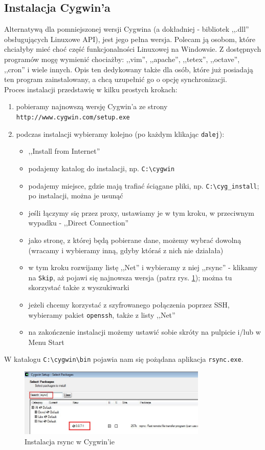 \subsection{Instalacja Cygwin'a}
\label{full}
Alternatywą dla pomniejszonej wersji Cygwina (a dokładniej - bibliotek ,,.dll'' obsługujących Linuxowe API), jest jego pełna wersja. Polecam ją osobom, które chciałyby mieć choć część funkcjonalności Linuxowej na Windowsie. Z dostępnych programów mogę wymienić chociażby: ,,vim'', ,,apache'', ,,tetex'', ,,octave'', ,,cron'' i wiele innych.  Opis ten dedykowany także dla osób, które już posiadają ten program zainstalowany, a chcą uzupełnić go o opcję synchronizacji. \\
Proces instalacji przedstawię w kilku prostych krokach:
\begin{enumerate}
\item pobieramy najnowszą wersję Cygwin'a ze strony \verb|http://www.cygwin.com/setup.exe|
\item podczas instalacji wybieramy kolejno (po każdym klikając \verb|dalej|):
  \begin{itemize}
  \item ,,Install from Internet''
  \item podajemy katalog do instalacji, np. \verb|C:\cygwin|
  \item podajemy miejsce, gdzie mają trafiać ściągane pliki, np. \verb|C:\cyg_install|; po instalacji, można je usunąć
  \item jeśli łączymy się przez proxy, ustawiamy je w tym kroku, w przeciwnym wypadku - ,,Direct Connection''
  \item jako stronę, z której będą pobierane dane, możemy wybrać dowolną (wracamy i wybieramy inną, gdyby któraś z nich nie działała)
  \item w tym kroku rozwijamy listę ,,Net'' i wybieramy z niej ,,rsync'' - klikamy na \verb|Skip|, aż pojawi się najnowsza wersja (patrz rys. \ref{cyg_inst}); można tu skorzystać także z wyszukiwarki
  \item jeżeli chcemy korzystać z szyfrowanego połączenia poprzez SSH, wybieramy pakiet \verb|openssh|, także z listy ,,Net''
  \item na zakończenie instalacji możemy ustawić sobie skróty na pulpicie i/lub w Menu Start
  \end{itemize}
\end{enumerate}
W katalogu \verb|C:\cygwin\bin| pojawia nam się pożądana aplikacja \verb|rsync.exe|.
\begin{figure}[h!]
	\centering
	\includegraphics[width=0.8\textwidth]{img/i4.jpeg}
	\caption{Instalacja rsync w Cygwin'ie}
	\label{cyg_inst}
\end{figure}

